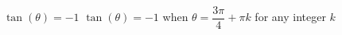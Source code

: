 {$\tan(\theta) = -1$}
{$\tan(\theta) = -1$ when $\theta = \dfrac{3\pi}{4} + \pi k$ for any integer $k$}

